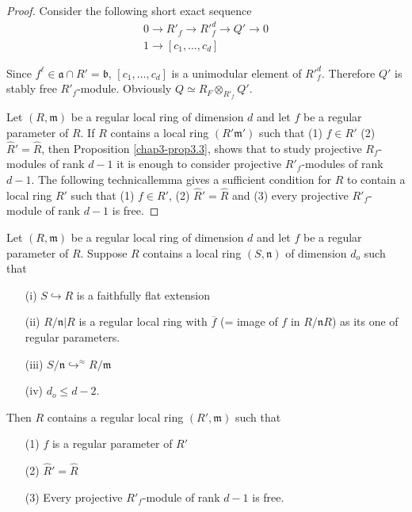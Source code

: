 \begin{proof}
Consider the following short exact sequence
\begin{gather*}
0\to R'_{f}\to {R'}^{d}_{f}\to Q'\to 0\\[3pt]
1\to [c_{1},\ldots,c_{d}]
\end{gather*}

Since $f^{\ell}\in \mathfrak{a}\cap R'=\mathfrak{b}$,
$[c_{1},\ldots,c_{d}]$ is a unimodular element of
${R'}^{d}_{f}$. Therefore $Q'$ is stably free
$R'_{f}$-module. Obviously $Q\simeq R_{F}\otimes_{R'_{f}}Q'$. 

Let $(R,\mathfrak{m})$ be a regular local ring of dimension $d$ and
let $f$ be a regular parameter of $R$. If $R$ contains a local ring
$(R'\mathfrak{m}')$ such that (1) $f\in R'$ (2)
$\widehat{R}'=\widehat{R}$, then Proposition \ref{chap3-prop3.3},
shows that to study projective $R_{f}$-modules of rank $d-1$ it is
enough to consider projective $R'_{f}$-modules of rank $d-1$. The
following technical\pageoriginale lemma gives a sufficient condition
for $R$ to contain a local ring $R'$ such that (1) $f\in R'$, (2)
$\widehat{R}'=\widehat{R}$ and (3) every projective $R'_{f}$-module of
rank $d-1$ is free. 
\end{proof}

\begin{lemma}\label{chap3-lem3.4}
Let $(R,\mathfrak{m})$ be a regular local ring of dimension $d$ and
let $f$ be a regular parameter of $R$. Suppose $R$ contains a local
ring $(S,\mathfrak{n})$ of dimension $d_{o}$ such that
\begin{itemize}
\item[\rm(i)] $S\hookrightarrow R$ is a faithfully flat extension

\item[\rm(ii)] $R/\mathfrak{n}|R$ is a regular local ring with
$\overline{f}$ (= image of $f$ in $R/\mathfrak{n}R$) as its one of
regular parameters. 

\item[\rm(iii)]
$S/\mathfrak{n}{\displaystyle{\mathop{\hookrightarrow}^{\approx}}}R/\mathfrak{m}$ 

\item[\rm(iv)] $d_{o}\leq d-2$.
\end{itemize}
Then $R$ contains a regular local ring $(R',\mathfrak{m})$ such that
\begin{itemize}
\item[\rm(1)] $f$ is a regular parameter of $R'$

\item[\rm(2)] $\widehat{R}'=\widehat{R}$

\item[\rm(3)] Every projective $R'_{f}$-module of rank $d-1$ is free.
\end{itemize}
\end{lemma}

